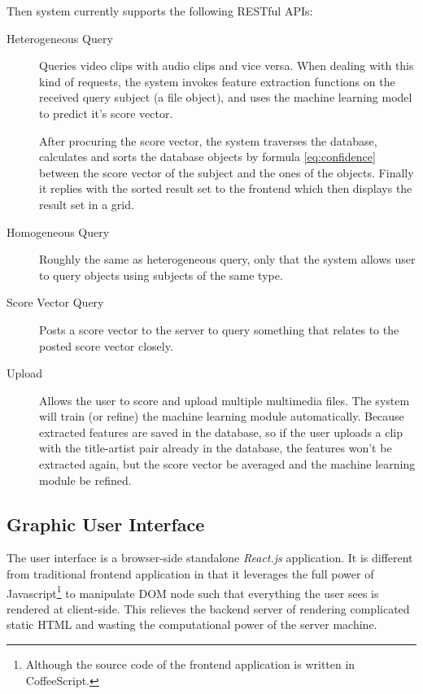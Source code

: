\documentclass{report}
\begin{document}
Then system currently supports the following RESTful APIs:
\begin{description}
\item[Heterogeneous Query] Queries video clips with audio clips and vice versa. When dealing with this kind of requests, the system invokes feature extraction functions on the received query subject (a file object), and uses the machine learning model to predict it's score vector.

After procuring the score vector, the system traverses the database, calculates and sorts the database objects by formula \ref{eq:confidence} between the score vector of the subject and the ones of the objects. Finally it replies with the sorted result set to the frontend which then displays the result set in a grid.

\item[Homogeneous Query] Roughly the same as heterogeneous query, only that the system allows user to query objects using subjects of the same type.

\item[Score Vector Query] Posts a score vector to the server to query something that relates to the posted score vector closely.

\item[Upload] Allows the user to score and upload multiple multimedia files. The system will train (or refine) the machine learning module automatically. Because extracted features are saved in the database, so if the user uploads a clip with the title-artist pair already in the database, the features won't be extracted again, but the score vector be averaged and the machine learning module be refined.

\end{description}


\subsection{Graphic User Interface}

The user interface is a browser-side standalone \textit{React.js} application. It is different from traditional frontend application in that it leverages the full power of Javascript\footnote{Although the source code of the frontend application is written in CoffeeScript.} to manipulate DOM node such that everything the user sees is rendered at client-side. This relieves the backend server of rendering complicated static HTML and wasting the computational power of the server machine.
\end{document}
